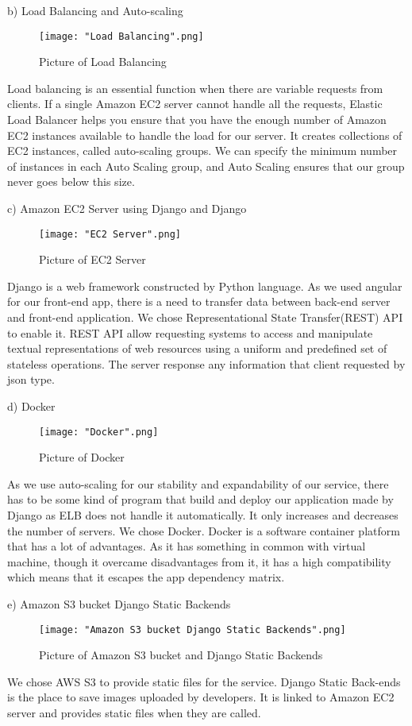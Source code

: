 \documentclass[10pt,journal,compsoc]{IEEEtran}
\begin{document}
\null\qquad b)	Load Balancing and Auto-scaling
\begin{figure}[H]
\centering
\texttt{[image: "Load Balancing".png]}
{\caption*{Picture of Load Balancing}}
\end{figure}
Load balancing is an essential function when there are variable requests from clients. If a single Amazon EC2 server cannot handle all the requests, Elastic Load Balancer helps you ensure that you have the enough number of Amazon EC2 instances available to handle the load for our server. It creates collections of EC2 instances, called auto-scaling groups. We can specify the minimum number of instances in each Auto Scaling group, and Auto Scaling ensures that our group never goes below this size. 

\null\qquad c)	Amazon EC2 Server using Django and Django 
\begin{figure}[H]
\centering
\texttt{[image: "EC2 Server".png]}
{\caption*{Picture of EC2 Server}}
\end{figure}

Django is a web framework constructed by Python language. As we used angular for our front-end app, there is a need to transfer data between back-end server and front-end application. We chose Representational State Transfer(REST) API to enable it. REST API allow requesting systems to access and manipulate textual representations of web resources using a uniform and predefined set of stateless operations. The server response any information that client requested by json type.

\null\qquad d)	Docker
\begin{figure}[H]
\centering
\texttt{[image: "Docker".png]}
{\caption*{Picture of Docker}}
\end{figure}
As we use auto-scaling for our stability and expandability of our service, there has to be some kind of program that build and deploy our application made by Django as ELB does not handle it automatically. It only increases and decreases the number of servers. We chose Docker. Docker is a software container platform that has a lot of advantages. As it has something in common with virtual machine, though it overcame disadvantages from it, it has a high compatibility which means that it escapes the app dependency matrix.

\null\qquad e)	Amazon S3 bucket Django Static Backends 
\begin{figure}[H]
\centering
\texttt{[image: "Amazon S3 bucket Django Static Backends".png]}
{\caption*{Picture of Amazon S3 bucket and Django Static Backends }}
\end{figure}
We chose AWS S3 to provide static files for the service. Django Static Back-ends is the place to save images uploaded by developers. It is linked to Amazon EC2 server and provides static files when they are called.
\end{document}
